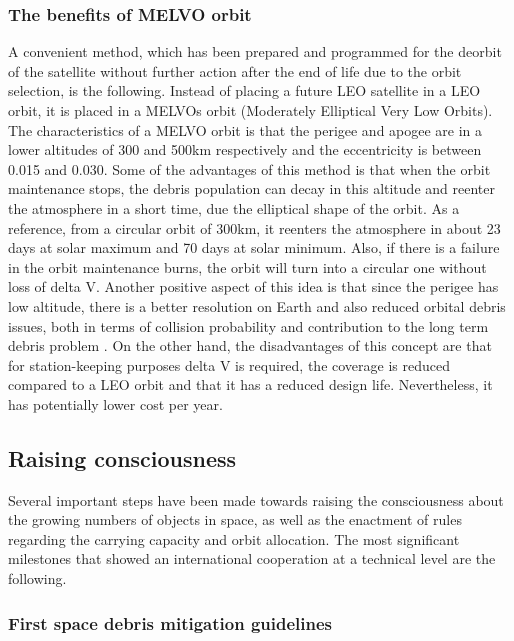 \subsubsection{The benefits of MELVO orbit}
A convenient method, which has been prepared and programmed for the deorbit of the satellite without further action after the end of life due to the orbit selection, is the following. Instead of placing a future LEO satellite in a LEO orbit, it is placed in a MELVOs orbit (Moderately Elliptical Very Low Orbits). The characteristics of a MELVO orbit is that the perigee and apogee are in a lower altitudes of 300 and 500km respectively and the eccentricity is between 0.015 and 0.030. Some of the advantages of this method is that when the orbit maintenance stops, the debris population can decay in this altitude and reenter the atmosphere in a short time, due the elliptical shape of the orbit. As a reference, from a circular orbit of 300km, it reenters the atmosphere in about 23 days at solar maximum and 70 days at solar minimum. Also, if there is a failure in the orbit maintenance burns, the orbit will turn into a circular one without loss of delta V. Another positive aspect of this idea is that since the perigee has low altitude, there is a better resolution on Earth and also reduced orbital debris issues, both in terms of collision probability and contribution to the long term debris problem \cite{Kramer 2002}. On the other hand, the disadvantages of this concept are that for station-keeping purposes delta V is required, the coverage is reduced compared to a LEO orbit and that it has a reduced design life. Nevertheless, it has potentially lower cost per year.



\bigskip
\subsection{Raising consciousness}
\bigskip

Several important steps have been made towards raising the consciousness about the growing numbers of objects in space, as well as the enactment of rules regarding the carrying capacity and orbit allocation. The most significant milestones that showed an international cooperation at a technical level are the following.

\bigskip
\subsubsection{First space debris mitigation guidelines}
\bigskip

